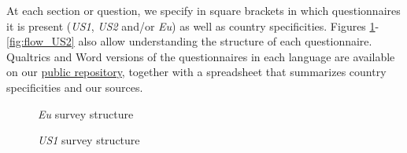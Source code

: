 \documentclass[12pt,english]{article}
\begin{document}
At each section or question, we specify in square brackets in which questionnaires it is present (\textit{US1}, \textit{US2} and/or \textit{Eu}) as well as country specificities. Figures \ref{fig:flow_Eu}-\ref{fig:flow_US2} also allow understanding the structure of each questionnaire. Qualtrics and Word versions of the questionnaires in each language are available on our \href{https://github.com/bixiou/international_attitudes_toward_global_policies/tree/main/questionnaire}{public repository}, together with a spreadsheet that summarizes country specificities and our sources.

\begin{figure}[h!]
    \caption{\textit{Eu} survey structure}\label{fig:flow_Eu}
\end{figure}

\begin{figure}[h!]
    \caption{\textit{US1} survey structure}\label{fig:flow_US1}
\end{figure}
\end{document}
